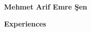 \documentclass{article}
\begin{document}
\raggedright


\begin{center}
  \huge{\textbf{Mehmet Arif Emre Şen}}
\end{center}        
\begin{multicols}{2} 
  
  
  
  \colbreak
  
\end{multicols}

\pagebreak

\begin{center}
  \huge{\textbf{Experiences}}
\end{center}

  
\pagebreak


\end{document}
